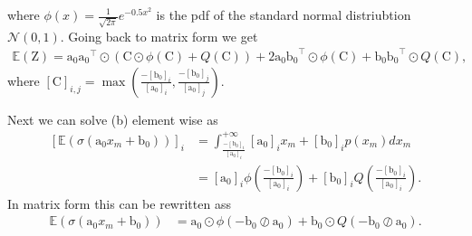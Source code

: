\documentclass[12pt]{article}
\newcommand{\vect}[1]{\boldsymbol{\mathrm{#1}}}
\newcommand{\mat}[1]{\boldsymbol{\mathrm{#1}}}
\newcommand{\expt}[1]{\mathbb{E}\left(#1\right)}
\theoremstyle{remark}
\begin{document}
where $\phi(x) = \frac{1}{\sqrt{2\pi}} e^{-0.5 x^2}$ is the pdf of the standard normal distriubtion $\mathcal{N}(0,1)$. Going back to matrix form we get 
\begin{align}
	\expt{\mat{Z}} = \vect{a_0} \vect{a_0}^{\intercal} \odot \left(\mat{C} \odot \phi(\mat{C}) + Q(\mat{C})\right) + 2 \vect{a_0}\vect{b_0}^{\intercal} \odot \phi(\mat{C}) + \vect{b_0}\vect{b_0}^{\intercal} \odot Q(\mat{C}),
\end{align}
where $[\mat{C}]_{i,j} = \max\left(\frac{-[\vect{b_0}]_i}{[\vect{a_0}]_i}, \frac{-[\vect{b_0}]_j}{[\vect{a_0}]_j}\right)$.

Next we can solve (b) element wise as
\begin{align}
	\left[\expt{\sigma(\vect{a_0}x_m + \vect{b_0})}\right]_i &= \int_{\frac{-[\vect{b_0}]_i}{[\vect{a_0}]_i}}^{+\infty} [\vect{a_0}]_i x_m + [\vect{b_0}]_i p(x_m)dx_m \\
	&= [\vect{a_0}]_i \phi\left(\frac{-[\vect{b_0}]_i}{[\vect{a_0}]_i}\right) + [\vect{b_0}]_i Q\left(\frac{-[\vect{b_0}]_i}{[\vect{a_0}]_i}\right).
\end{align}
In matrix form this can be rewritten ass
\begin{align}
	\expt{\sigma(\vect{a_0}x_m + \vect{b_0})} &= \vect{a_0} \odot \phi(-\vect{b_0} \oslash \vect{a_0}) + \vect{b_0} \odot Q(-\vect{b_0} \oslash \vect{a_0}).
\end{align}
\end{document}
